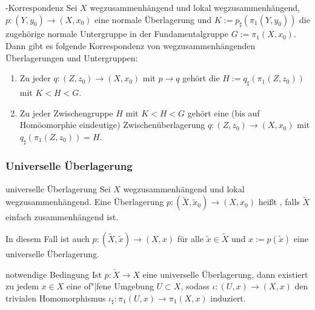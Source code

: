 \begin{Satz}{-Korrespondenz}
    Sei $X$ wegzusammenhängend und lokal wegzusammenhängend,
    $p\colon (Y, y_0) \rightarrow (X, x_0)$ eine normale Überlagerung und
    $K := p_\sharp(\pi_1(Y, y_0))$ die zugehörige normale Untergruppe in der
    Fundamentalgruppe $G := \pi_1(X, x_0)$.
    Dann gibt es folgende Korrespondenz von wegzusammenhängenden Überlagerungen
    und Untergruppen:
    \begin{enumerate}
        \item
        Zu jeder 
        $q\colon (Z, z_0) \rightarrow (X, x_0)$ mit
        $p \rightarrow q$ gehört die 
        $H := q_\sharp(\pi_1(Z, z_0))$ mit $K < H < G$.
        
        \item
        Zu jeder Zwischengruppe $H$ mit $K < H < G$ gehört eine
        (bis auf Homöomorphie eindeutige) Zwischenüberlagerung
        $q\colon (Z, z_0) \rightarrow (X, x_0)$ mit
        $q_\sharp(\pi_1(Z, z_0)) = H$.
    \end{enumerate}
\end{Satz}

\pagebreak

\subsubsection{%
    Universelle Überlagerung%
}

\begin{Def}{universelle Überlagerung}
    Sei $X$ wegzusammenhängend und lokal wegzusammenhängend.
    Eine Überlagerung
    $p\colon (\widetilde{X}, \widetilde{x}_0) \rightarrow (X, x_0)$ heißt
    , falls $\widetilde{X}$ einfach zusammenhängend ist.
\end{Def}

\begin{Bem}
    In diesem Fall ist auch
    $p\colon (\widetilde{X}, \widetilde{x}) \rightarrow (X, x)$ für alle
    $\widetilde{x} \in \widetilde{X}$ und $x := p(\widetilde{x})$ eine
    universelle Überlagerung.
\end{Bem}

\linie

\begin{Satz}{notwendige Bedingung}
    Ist $p\colon \widetilde{X} \rightarrow X$ eine universelle Überlagerung,
    dann existiert zu jedem $x \in X$ eine of"|fene Umgebung $U \subset X$,
    sodass $\iota\colon (U, x) \rightarrow (X, x)$ den trivialen Homomorphismus
    $\iota_\sharp\colon \pi_1(U, x) \rightarrow \pi_1(X, x)$ induziert.
\end{Satz}

